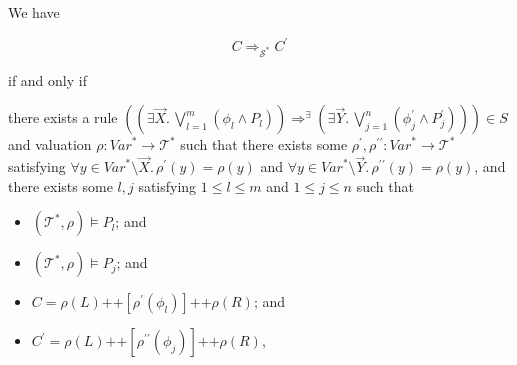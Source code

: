 \documentclass{article}
\newenvironment{proofenv}
  {
    \VerbatimEnvironment\begin{tcolorbox}[colback=black!0!white] %
  }
  {
   \end{tcolorbox}
  }
\begin{document}
\begin{lemma}\label{lem:simplifyComposite}
We have
\begin{proofenv}
    \begin{equation*}
        C \Rightarrow_{\mathcal{S}^*} C^\prime
    \end{equation*}
\end{proofenv}
    if and only if
\begin{proofenv}
    there exists a rule $((\exists \vec{X}.\, \bigvee_{l=1}^{m} (\phi_l \land P_l)) \Rightarrow^\exists (\exists \vec{Y}.\,     \bigvee_{j=1}^{n} (\phi^\prime_j \land P^\prime_j))) \in S$
    and valuation $\rho : \mathit{Var}^* \to \mathcal{T}^*$ such that
    there exists some $\rho^\prime,\rho^{\prime\prime} : \mathit{Var}^* \to \mathcal{T}^*$
    satisfying $\forall y \in \mathit{Var}^* \setminus \vec{X}.\, \rho^\prime(y) = \rho(y)$
    and $\forall y \in \mathit{Var}^* \setminus \vec{Y}.\, \rho^{\prime\prime}(y) = \rho(y)$,
    and there exists some $l,j$ satisfying $1 \leq l \leq m$ and $1 \leq j \leq n$ such that
    \begin{itemize}
        \item $(\mathcal{T}^*, \rho) \vDash P_l$; and
        \item $(\mathcal{T}^*, \rho) \vDash P_j$; and
        \item $C = \rho(L) \texttt{++} [\rho^\prime(\phi_l)] \texttt{++} \rho(R)$; and
        \item $C^\prime = \rho(L) \texttt{++} [\rho^{\prime\prime}(\phi_j)] 
        \texttt{++} \rho(R)$,
    \end{itemize}
\end{proofenv}
\end{lemma}
\end{document}
